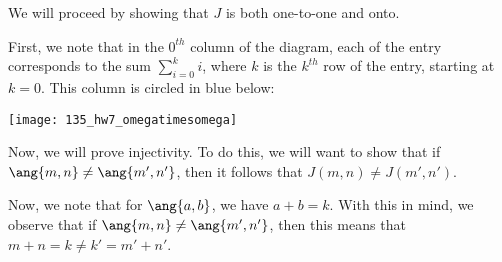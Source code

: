 \documentclass{article}
\begin{document}
\begin{solution}
\begin{comment}
			And if $b = 0$, then we have:
			\begin{align*}
				g(I(\ang{a,b})) &= g(\ang{0, a+1}) \\
				&= \dfrac{1}{2}\pr{ (a+1)^{2} + 3(0) + (a+1)} \\
				&= \dfrac{1}{2}\pr{a^{2} + a + 1} \\
				&= g\pr{\ang{0,a}} + 1 \\
				&= n+1\\
				&= n^{+}
			\end{align*}
			
			Thus, we conclude that $J \circ f = 1_\omega$ as desired.
		\end{innerproof}
		
		For the other direction, proceed as follows:
		\begin{innerproof}
			We induct on $n$.
			
			We see that for $n = 0$, we have $(f \circ J)(0, 0) = 0$.
			
			Then, suppose that our claim holds for $n$. So, we now check $n^{+}$.
			
			Observe that:
			\begin{align*}
				(f \circ J)(0, n^{+}) &= (f \circ J)(0, n+1) \\
				&= f(J(0, n+1)) \\
				&= f\pr{ \dfrac{1}{2}\br{ \pr{n+1}^{2} + 3(0) + n+1} } \\
				&= f\pr{\dfrac{1}{2}}
			\end{align*}
		\end{innerproof}
	\end{comment}
	We will proceed by showing that $J$ is both one-to-one and onto.
	
	First, we note that in the $0^{th}$ column of the diagram, each of the entry corresponds to the sum $\sum_{i=0}^{k} i$, where $k$ is the $k^{th}$ row of the entry, starting at $k = 0$. This column is circled in blue below:
	
	\begin{center}
		\texttt{[image: 135\_hw7\_omegatimesomega]}
	\end{center}
	 
	 Now, we will prove injectivity. To do this, we will want to show that if $\ang{m,n} \neq \ang{m', n'}$, then it follows that $J(m,n) \neq J(m', n')$.
	 
	 Now, we note that for $\ang{a,b}$, we have $a+b = k$. With this in mind, we observe that if $\ang{m,n} \neq \ang{m', n'}$, then this means that $m+n = k \neq k' = m'+n'$.
	 

\end{solution}
\end{document}
